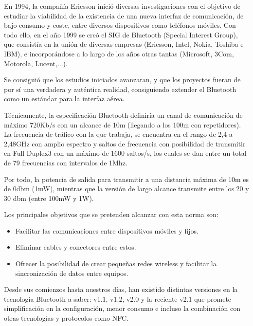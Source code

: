 En 1994, la compañía Ericsson inició diversas investigaciones con el 
objetivo de estudiar la viabilidad de la existencia de una nueva interfaz de 
comunicación, de bajo consumo y coste, entre diversos dispositivos como 
teléfonos móviles. Con todo ello, en el año 1999 se creó el SIG de Bluetooth 
(Special Interest Group), que consistía en la unión de diversas empresas 
(Ericsson, Intel, Nokia, Toshiba e IBM), e incorporándose a lo largo de
los años otras tantas (Microsoft, 3Com, Motorola, Lucent,...).

Se consiguió que los estudios iniciados avanzaran, y que los proyectos 
fueran de por sí una verdadera y auténtica realidad, consiguiendo extender 
el Bluetooth como un estándar para la interfaz aérea.

Técnicamente, la especificación Bluetooth definiría un canal de comunicación 
de máximo 720Kb/s con un alcance de 10m (llegando a los 100m con 
repetidores). La frecuencia de tráfico con la que trabaja, se encuentra en 
el rango de 2,4 a 2,48GHz con amplio espectro y saltos de frecuencia con 
posibilidad de transmitir en Full-Duplex3 con un máximo de 1600 saltos/s, 
los cuales se dan entre un total de 79 frecuencias con intervalos de 1Mhz.

Por todo, la potencia de salida para transmitir a una distancia máxima de 
10m es de 0dbm (1mW), mientras que la versión de largo alcance transmite 
entre los 20 y 30 dbm (entre 100mW y 1W).

Los principales objetivos que se pretenden alcanzar con esta norma son:
\begin{itemize}
\item Facilitar las comunicaciones entre dispositivos móviles y fijos.
\item Eliminar cables y conectores entre estos.
\item Ofrecer la posibilidad de crear pequeñas redes wireless y facilitar la
sincronización de datos entre equipos.
\end{itemize}

Desde sus comienzos hasta nuestros días, han existido distintas versiones en 
la tecnología Bluetooth a saber: v1.1, v1.2, v2.0 y la reciente v2.1 que 
promete simplificación en la configuración, menor consumo e incluso la 
combinación con otras tecnologías y protocolos como NFC.

